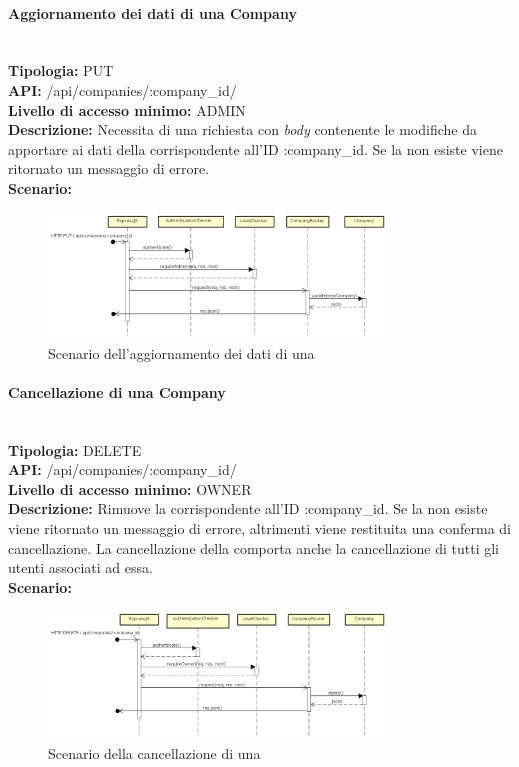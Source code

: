 \paragraph{Aggiornamento dei dati di una Company}\mbox{}\\
\textbf{Tipologia:} PUT \\
\textbf{API:} /api/companies/:company\_id/ \\
\textbf{Livello di accesso minimo:} ADMIN \\
\textbf{Descrizione:} Necessita di una richiesta con \textit{body} contenente le modifiche da apportare ai dati della  corrispondente all'ID :company\_id. Se la  non esiste viene ritornato un messaggio di errore. \\
\textbf{Scenario:} 
\begin{figure}[H]
\centering
\includegraphics[width=0.8\textwidth]{res/sections/backend/sequence/(PUT)company.png}
\caption{Scenario dell'aggiornamento dei dati di una }
\end{figure}

\newpage
\paragraph{Cancellazione di una Company}\mbox{}\\
\textbf{Tipologia:} DELETE \\
\textbf{API:} /api/companies/:company\_id/ \\
\textbf{Livello di accesso minimo:} OWNER \\
\textbf{Descrizione:} Rimuove la  corrispondente all'ID :company\_id. Se la  non esiste viene ritornato un messaggio di errore, altrimenti viene restituita una conferma di cancellazione. La cancellazione della  comporta anche la cancellazione di tutti gli utenti associati ad essa. \\
\textbf{Scenario:} 
\begin{figure}[H]
\centering
\includegraphics[width=0.8\textwidth]{res/sections/backend/sequence/(DELETE)company.png}
\caption{Scenario della cancellazione di una }
\end{figure}

